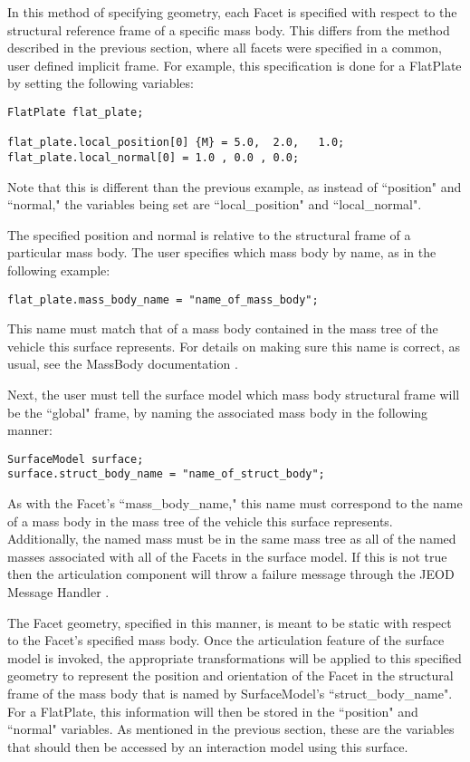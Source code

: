 In this method of specifying geometry, each Facet is specified with respect
to the structural reference frame of a specific mass body. This differs
from the method described in the previous section, where all facets
were specified in a common, user defined implicit frame. For example,
this specification is done for a FlatPlate by setting the following
variables:

\begin{verbatim}
FlatPlate flat_plate;

flat_plate.local_position[0] {M} = 5.0,  2.0,   1.0;
flat_plate.local_normal[0] = 1.0 , 0.0 , 0.0;
\end{verbatim}

Note that this is different than the previous example, as instead of
``position" and ``normal," the variables being set are
``local\_position" and ``local\_normal".

The specified position and normal
is relative to the structural frame of a particular mass body. The
user specifies which mass body by name, as in the following
example:

\begin{verbatim}
flat_plate.mass_body_name = "name_of_mass_body";
\end{verbatim}

This name must match that of a mass body contained in the
mass tree of the vehicle this surface represents. For details
on making sure this name is correct, as usual, see the
MassBody documentation \cite{dynenv:MASS}.

Next, the user must tell the surface model which mass body
structural frame will be the ``global" frame, by naming the
associated mass body in the following manner:

\begin{verbatim}
SurfaceModel surface;
surface.struct_body_name = "name_of_struct_body";
\end{verbatim}

As with the Facet's ``mass\_body\_name," this name must correspond to the
name of a mass body in the mass tree of the vehicle this surface
represents. Additionally, the named mass must be in the same mass tree
as all of the named masses associated with all of the Facets in the
surface model. If this is not true then the articulation component
will throw a failure message through the JEOD Message Handler
\cite{dynenv:MESSAGE}.

The Facet geometry, specified in this manner, is meant to be static with
respect to the Facet's specified mass body. Once the articulation feature
of the surface model is invoked, the appropriate transformations
will be applied to this specified geometry to represent the position
and orientation of the Facet in the structural frame
of the mass body that is named by SurfaceModel's ``struct\_body\_name". For a FlatPlate,
this information will then be stored in the ``position" and ``normal" variables.
As mentioned in the previous section, these are the variables that should then
be accessed by an interaction model using this surface.

